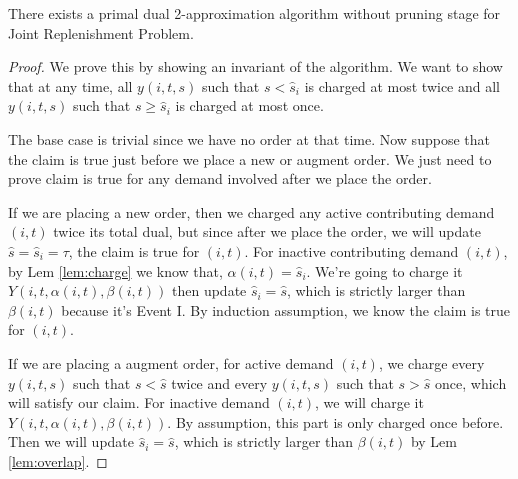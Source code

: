 \begin{theorem}
There exists a primal dual 2-approximation algorithm without pruning stage for Joint Replenishment Problem.
\end{theorem}
\begin{proof}
We prove this by showing an invariant of the algorithm. We want to show that at any time, all $y(i,t,s)$ such that $s < \hat s_i$ is charged at most twice and all $y(i,t,s)$ such that $s \ge \hat s_i$ is charged at most once.

The base case is trivial since we have no order at that time. Now suppose that the claim is true just before we place a new or augment order. We just need to prove claim is true for any demand involved after we place the order.

If we are placing a new order, then we charged any active contributing demand $(i,t)$ twice its total dual, but since after we place the order, we will update $\hat s = \hat s_i = \tau$, the claim is true for $(i,t)$. For inactive contributing demand $(i,t)$, by Lem \ref{lem:charge} we know that, $\alpha(i,t) = \hat s_i$. We're going to charge it  $Y(i,t,\alpha(i,t),\beta(i,t))$ then update $\hat s_i = \hat s$, which is strictly larger than $\beta(i,t)$ because it's Event I. By induction assumption, we know the claim is true for $(i,t)$.

If we are placing a augment order, for active demand $(i,t)$, we charge every $y(i,t,s)$ such that $s < \hat s$ twice and every $y(i,t,s)$ such that $s > \hat s$ once, which will satisfy our claim. For inactive demand $(i,t)$, we will charge it $Y(i,t,\alpha(i,t),\beta(i,t))$. By assumption, this part is only charged once before. Then we will update $\hat s_i = \hat s$, which is strictly larger than $\beta(i,t)$ by Lem \ref{lem:overlap}.
\end{proof}

